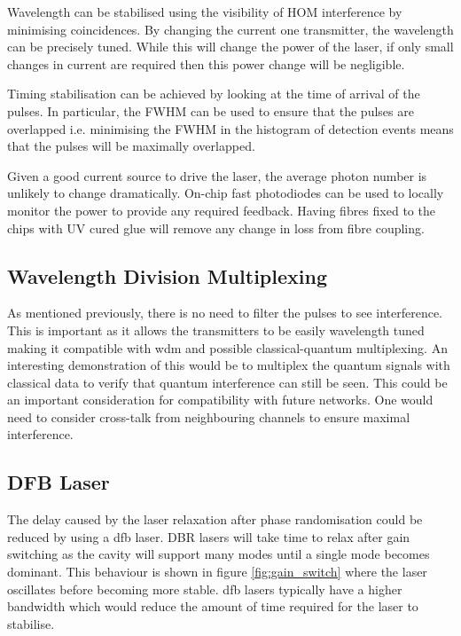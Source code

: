 Wavelength can be stabilised using the visibility of \ac{HOM} interference by minimising coincidences. By changing the current one transmitter, the wavelength can be precisely tuned. While this will change the power of the laser, if only small changes in current are required then this power change will be negligible.

Timing stabilisation can be achieved by looking at the time of arrival of the pulses. In particular, the \ac{FWHM} can be used to ensure that the pulses are overlapped i.e. minimising the \ac{FWHM} in the histogram of detection events means that the pulses will be maximally overlapped.

Given a good current source to drive the laser, the average photon number is unlikely to change dramatically. On-chip fast photodiodes can be used to locally monitor the power to provide any required feedback. Having fibres fixed to the chips with UV cured glue will remove any change in loss from fibre coupling.

%

\subsection{Wavelength Division Multiplexing}

As mentioned previously, there is no need to filter the pulses to see interference. This is important as it allows the transmitters to be easily wavelength tuned making it compatible with \ac{wdm} and possible classical-quantum multiplexing. An interesting demonstration of this would be to multiplex the quantum signals with classical data to verify that quantum interference can still be seen. This could be an important consideration for compatibility with future networks. One would need to consider cross-talk from neighbouring channels to ensure maximal interference.

\subsection{DFB Laser}

The delay caused by the laser relaxation after phase randomisation could be reduced by using a \ac{dfb} laser. \ac{DBR} lasers will take time to relax after gain switching as the cavity will support many modes until a single mode becomes dominant. This behaviour is shown in figure \ref{fig:gain_switch} where the laser oscillates before becoming more stable. \Ac{dfb} lasers typically have a higher bandwidth which would reduce the amount of time required for the laser to stabilise.

